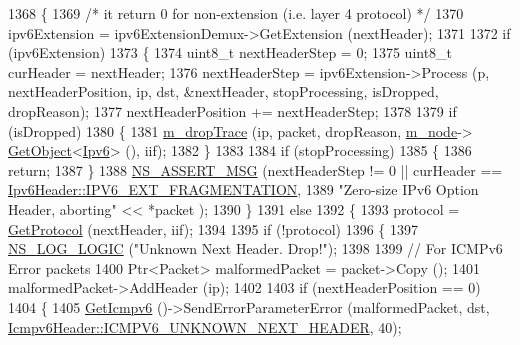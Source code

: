 \begin{DoxyCode}
1368     \{
1369       \textcolor{comment}{/* it return 0 for non-extension (i.e. layer 4 protocol) */}
1370       ipv6Extension = ipv6ExtensionDemux->GetExtension (nextHeader);
1371 
1372       \textcolor{keywordflow}{if} (ipv6Extension)
1373         \{
1374           uint8\_t nextHeaderStep = 0;
1375           uint8\_t curHeader = nextHeader;
1376           nextHeaderStep = ipv6Extension->Process (p, nextHeaderPosition, ip, dst, &nextHeader, 
      stopProcessing, isDropped, dropReason);
1377           nextHeaderPosition += nextHeaderStep;
1378 
1379           \textcolor{keywordflow}{if} (isDropped)
1380             \{
1381               \hyperlink{classns3_1_1Ipv6L3Protocol_ac22d2d63cac436267ae6cafc46880a6e}{m\_dropTrace} (ip, packet, dropReason, \hyperlink{classns3_1_1Ipv6L3Protocol_a543d8509395ee76de15d039ff1fce642}{m\_node}->
      \hyperlink{classns3_1_1Object_a13e18c00017096c8381eb651d5bd0783}{GetObject}<\hyperlink{classns3_1_1Ipv6_adccc58acd14d3f9a28f75dc09e794998}{Ipv6}> (), iif);
1382             \}
1383 
1384           \textcolor{keywordflow}{if} (stopProcessing)
1385             \{
1386               \textcolor{keywordflow}{return};
1387             \}
1388           \hyperlink{assert_8h_aff5ece9066c74e681e74999856f08539}{NS\_ASSERT\_MSG} (nextHeaderStep != 0 || curHeader == 
      \hyperlink{classns3_1_1Ipv6Header_a226429221a066c5e3b1f260caf27d1e9a5839daf3fdfb16dfdc94a208ca6ebc5a}{Ipv6Header::IPV6\_EXT\_FRAGMENTATION},
1389                          \textcolor{stringliteral}{"Zero-size IPv6 Option Header, aborting"} << *packet );
1390         \}
1391       \textcolor{keywordflow}{else}
1392         \{
1393           protocol = \hyperlink{classns3_1_1Ipv6L3Protocol_acb189bb5deceb95e78f2a443609c8d64}{GetProtocol} (nextHeader, iif);
1394 
1395           \textcolor{keywordflow}{if} (!protocol)
1396             \{
1397               \hyperlink{group__logging_ga88acd260151caf2db9c0fc84997f45ce}{NS\_LOG\_LOGIC} (\textcolor{stringliteral}{"Unknown Next Header. Drop!"});
1398 
1399               \textcolor{comment}{// For ICMPv6 Error packets}
1400               Ptr<Packet> malformedPacket  = packet->Copy ();
1401               malformedPacket->AddHeader (ip);
1402 
1403               \textcolor{keywordflow}{if} (nextHeaderPosition == 0)
1404                 \{
1405                   \hyperlink{classns3_1_1Ipv6L3Protocol_a10384a4dc85c61e65cf73b47ec9da90d}{GetIcmpv6} ()->SendErrorParameterError (malformedPacket, dst, 
      \hyperlink{classns3_1_1Icmpv6Header_ae9230cd167393f553a3c2ded106858caa0eae2e0ddc20524b6a988de9631096c6}{Icmpv6Header::ICMPV6\_UNKNOWN\_NEXT\_HEADER}, 40);

\end{DoxyCode}
